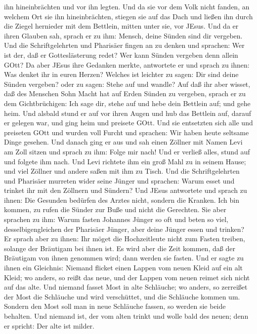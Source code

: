 ihn hineinbrächten und vor ihn legten.  Und da sie vor dem
Volk nicht fanden, an welchem Ort sie ihn hineinbrächten, stiegen sie
auf das Dach und ließen ihn durch die Ziegel hernieder mit dem Bettlein,
mitten unter sie, vor JEsus.  Und da er ihren Glauben sah,
sprach er zu ihm: Mensch, deine Sünden sind dir vergeben. 
Und die Schriftgelehrten und Pharisäer fingen an zu denken und sprachen:
Wer ist der, daß er Gotteslästerung redet? Wer kann Sünden vergeben denn
allein GOtt?  Da aber JEsus ihre Gedanken merkte,
antwortete er und sprach zu ihnen: Was denket ihr in euren Herzen?
 Welches ist leichter zu sagen: Dir sind deine Sünden
vergeben? oder zu sagen: Stehe auf und wandle?  Auf daß ihr
aber wisset, daß des Menschen Sohn Macht hat auf Erden Sünden zu
vergeben, sprach er zu dem Gichtbrüchigen: Ich sage dir, stehe auf und
hebe dein Bettlein auf; und gehe heim.  Und alsbald stund
er auf vor ihren Augen und hub das Bettlein auf, darauf er gelegen war,
und ging heim und preisete GOtt.  Und sie entsetzten sich
alle und preiseten GOtt und wurden voll Furcht und sprachen: Wir haben
heute seltsame Dinge gesehen.  Und danach ging er aus und
sah einen Zöllner mit Namen Levi am Zoll sitzen und sprach zu ihm: Folge
mir nach!  Und er verließ alles, stund auf und folgete ihm
nach.  Und Levi richtete ihm ein groß Mahl zu in seinem
Hause; und viel Zöllner und andere saßen mit ihm zu Tisch. 
Und die Schriftgelehrten und Pharisäer murreten wider seine Jünger und
sprachen: Warum esset und trinket ihr mit den Zöllnern und Sündern?
 Und JEsus antwortete und sprach zu ihnen: Die Gesunden
bedürfen des Arztes nicht, sondern die Kranken.  Ich bin
kommen, zu rufen die Sünder zur Buße und nicht die Gerechten.
 Sie aber sprachen zu ihm: Warum fasten Johannes Jünger so
oft und beten so viel, desselbigengleichen der Pharisäer Jünger, aber
deine Jünger essen und trinken?  Er sprach aber zu ihnen:
Ihr möget die Hochzeitleute nicht zum Fasten treiben, solange der
Bräutigam bei ihnen ist.  Es wird aber die Zeit kommen, daß
der Bräutigam von ihnen genommen wird; dann werden sie fasten.
 Und er sagte zu ihnen ein Gleichnis: Niemand flicket einen
Lappen vom neuen Kleid auf ein alt Kleid; wo anders, so reißt das neue,
und der Lappen vom neuen reimet sich nicht auf das alte. 
Und niemand fasset Most in alte Schläuche; wo anders, so zerreißet der
Most die Schläuche und wird verschüttet, und die Schläuche kommen um.
 Sondern den Most soll man in neue Schläuche fassen, so
werden sie beide behalten.  Und niemand ist, der vom alten
trinkt und wolle bald des neuen; denn er spricht: Der alte ist milder.

